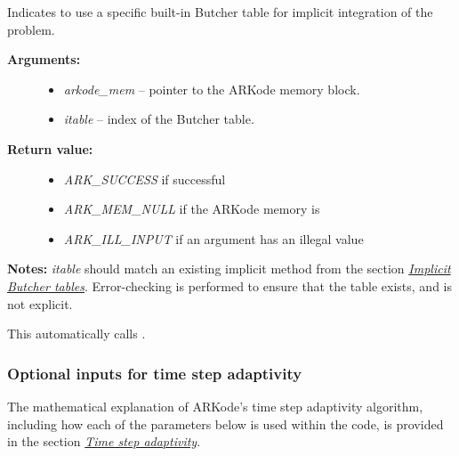 \documentclass[letterpaper,10pt,english]{sphinxmanual}
\begin{document}
\begin{fulllineitems}
\label{c_interface/User_callable:ARKodeSetIRKTableNum}
Indicates to use a specific built-in Butcher table for implicit
integration of the problem.
\begin{description}
\item[{\textbf{Arguments:}}] \leavevmode\begin{itemize}
\item {} 
\emph{arkode\_mem} -- pointer to the ARKode memory block.

\item {} 
\emph{itable} -- index of the Butcher table.

\end{itemize}

\item[{\textbf{Return value:}}] \leavevmode\begin{itemize}
\item {} 
\emph{ARK\_SUCCESS} if successful

\item {} 
\emph{ARK\_MEM\_NULL} if the ARKode memory is 

\item {} 
\emph{ARK\_ILL\_INPUT} if an argument has an illegal value

\end{itemize}

\end{description}

\textbf{Notes:} \emph{itable} should match an existing implicit method from
the section {\hyperref[Butcher:butcher-implicit]{\emph{Implicit Butcher tables}}}.  Error-checking is performed
to ensure that the table exists, and is not explicit.

This automatically calls {\hyperref[c_interface/User_callable:ARKodeSetImplicit]{}}.

\end{fulllineitems}



\subsubsection{Optional inputs for time step adaptivity}
\label{c_interface/User_callable:cinterface-arkodeadaptivityinputtable}\label{c_interface/User_callable:optional-inputs-for-time-step-adaptivity}
The mathematical explanation of ARKode's time step adaptivity
algorithm, including how each of the parameters below is used within
the code, is provided in the section {\hyperref[Mathematics:mathematics-adaptivity]{\emph{Time step adaptivity}}}.
\end{document}
